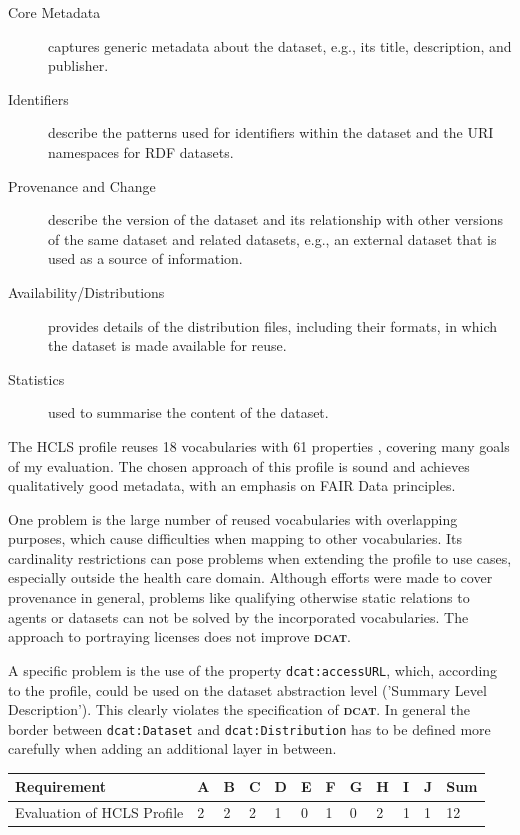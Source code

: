 \documentclass[a4paper,english,twoside,BCOR1.5cm,headsepline,DIV12,appendixprefix,final,12pt]{scrbook}
\newcommand{\dcat}{{\scshape\bfseries dcat}\xspace}
\newcommand{\prop}[1]{{{\texttt{#1}}}}
\begin{document}
\begin{description}
\item[Core Metadata] captures generic metadata about the dataset, e.g., its title, description, and publisher.

\item[Identifiers] describe the patterns used for identifiers within the dataset and the URI namespaces for RDF datasets.

\item[Provenance and Change] describe the version of the dataset and its relationship with other versions of the same dataset and related datasets, e.g., an external dataset that is used as a source of information.

\item[Availability/Distributions] provides details of the distribution files, including their formats, in which the dataset is made available for reuse.

\item[Statistics] used to summarise the content of the dataset.
\end{description}

The HCLS profile reuses 18 vocabularies with 61 properties \cite{HCLSCP2016}, covering many goals of my evaluation. The chosen approach of this profile is sound and achieves qualitatively good metadata, with an emphasis on FAIR Data principles.

One problem is the large number of reused vocabularies with overlapping purposes, which cause difficulties when mapping to other vocabularies. Its cardinality restrictions can pose problems when extending the profile to use cases, especially outside the health care domain. Although efforts were made to cover provenance in general, problems like qualifying otherwise static relations to agents or datasets can not be solved by the incorporated vocabularies. The approach to portraying licenses does not improve \dcat.

A specific problem is the use of the property \prop{dcat:accessURL}, which, according to the profile, could be used on the dataset abstraction level ('Summary Level Description'). This clearly violates the specification of \dcat. In general the border between \prop{dcat:Dataset} and \prop{dcat:Distribution} has to be defined more carefully when adding an additional layer in between.

\begin{table}[!htbp]
    \centering
    \begin{tabular}{|l|l|l|l|l|l|l|l|l|l|l|l|}
        \hline
        Requirement & A & B & C & D & E & F & G & H & I & J & Sum \\
        \hline
        Evaluation of HCLS Profile & 2 & 2 & 2 & 1 & 0 & 1 & 0 & 2 & 1 & 1 & 12 \\
        \hline
    \end{tabular}
    \label{tab:evaldcatap}
\end{table}
\end{document}
